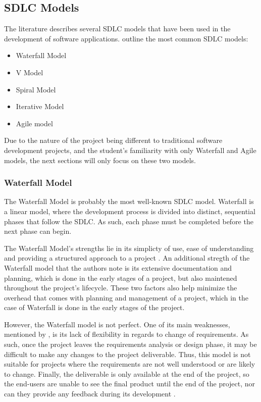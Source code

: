 \subsection{SDLC Models}

The literature describes several SDLC models that have been used in the development of software applications. \textcite{sdlc1, sdlc2} outline the most common SDLC models:
\begin{itemize}
    \item Waterfall Model
    \item V Model
    \item Spiral Model
    \item Iterative Model
    \item Agile model
\end{itemize}

Due to the nature of the project being different to traditional software development projects, and the student's familiarity with only Waterfall and Agile models, the next sections will only focus on these two models.

\subsubsection{Waterfall Model}

The Waterfall Model is probably the most well-known SDLC model. Waterfall is a linear model, where the development process is divided into distinct, sequential phases that follow the SDLC. As such, each phase must be completed before the next phase can begin.

The Waterfall Model's strengths lie in its simplicty of use, ease of understanding and providing a structured approach to a project \parencite{waterfall}. An additional stregth of the Waterfall model that the authors note is its extensive documentation and planning, which is done in the early stages of a project, but also maintened throughout the project's lifecycle. These two factors also help minimize the overhead that comes with planning and management of a project, which in the case of Waterfall is done in the early stages of the project.

However, the Waterfall model is not perfect. One of its main weaknesses, mentioned by \textcite{waterfall}, is its lack of flexibility in regards to change of requirements. As such, once the project leaves the requirements analysis or design phase, it may be difficult to make any changes to the project deliverable. Thus, this model is not suitable for projects where the requirements are not well understood or are likely to change. Finally, the deliverable is only available at the end of the project, so the end-users are unable to see the final product until the end of the project, nor can they provide any feedback during its development \parencite{waterfall}.


